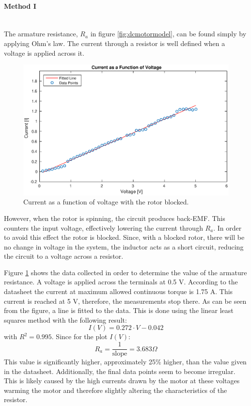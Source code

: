 \paragraph{Method I}~\\
The armature resistance, $R_a$ in figure \ref{fig:dcmotormodel}, can be found simply by applying Ohm's law.
The current through a resistor is well defined when a voltage is applied across it.

\begin{figure}[!h]
	\centering
	\includegraphics[width=\linewidth]{graphics/raplot}
	\caption{Current as a function of voltage with the rotor blocked.}
	\label{fig:raplot}
\end{figure}

However, when the rotor is spinning, the circuit produces back-EMF.
This counters the input voltage, effectively lowering the current through $R_a$.
In order to avoid this effect the rotor is blocked.
Since, with a blocked rotor, there will be no change in voltage in the system, the inductor acts as a short circuit, reducing the circuit to a voltage across a resistor. 

Figure \ref{fig:raplot} shows the data collected in order to determine the value of the armature resistance.
A voltage is applied across the terminals at 0.5 V.
According to the datasheet \cite{pittmann} the current at maximum allowed continuous torque is 1.75 A.
This current is reached at 5 V, therefore, the measurements stop there.
As can be seen from the figure, a line is fitted to the data.
This is done using the linear least squares method with the following result:
$$I(V)=0.272\cdot V-0.042$$
with $R^2=0.995$.
Since for the plot $I(V)$:
$$R_a = \frac{1}{\text{slope}} = 3.683\Omega$$
This value is significantly higher, approximately 25\% higher, than the value given in the datasheet.
Additionally, the final data points seem to become irregular.
This is likely caused by the high currents drawn by the motor at these voltages warming the motor and therefore slightly altering the characteristics of the resistor.

